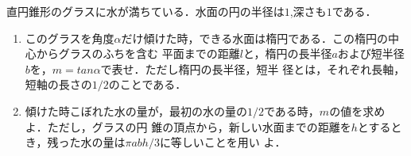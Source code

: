 \documentclass[a4j]{jarticle}
\begin{document}

\begin{oframed}
直円錐形のグラスに水が満ちている．水面の円の半径は$1$,深さも$1$である．　
     \begin{enumerate}[(1)]
     \item このグラスを角度$\alpha$だけ傾けた時，できる水面は楕円である．この楕円の中心からグラスのふちを含む
     平面までの距離$l$と，楕円の長半径$a$および短半径$b$を，$m=tan\alpha$で表せ．ただし楕円の長半径，短半 
     径とは，それぞれ長軸，短軸の長さの$1/2$のことである．　
　 \item 傾けた時こぼれた水の量が，最初の水の量の$1/2$である時，$m$の値を求めよ．ただし，グラスの円
     錐の頂点から，新しい水面までの距離を$h$とするとき，残った水の量は$\pi abh/3$に等しいことを用い
     よ．
     \end{enumerate}
\end{oframed}

\setlength{\columnseprule}{0.4pt}
\begin{multicols}{2}
\end{multicols}
\end{document}
